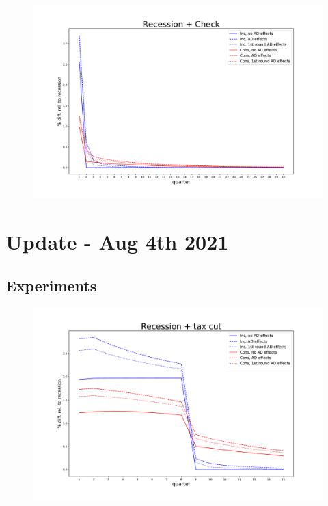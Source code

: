 \documentclass[]{article}
\begin{document}
\begin{figure}
	\centering
	\includegraphics[width=\linewidth]{../Full_Run_3Educ_Oct24th/recession_Check_relrecession}
	\caption{}
	\label{fig:recessioncheckrelrecession}
\end{figure}


	\FloatBarrier
\section{Update - Aug 4th 2021}
\FloatBarrier

\subsection{Experiments}


\begin{figure}
	\centering
	\includegraphics[width=\linewidth]{../FullRun_June7th/recession_taxcut_relrecession}
	\caption{}
	\label{fig:recessiontaxcutrelrecession}
\end{figure}
\end{document}
